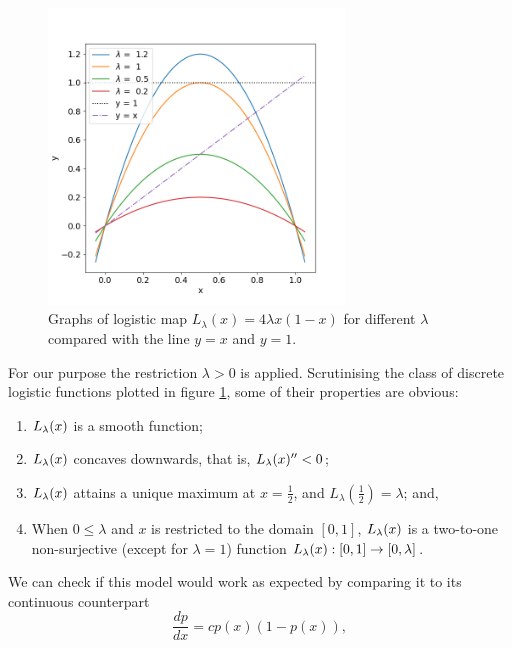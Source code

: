 \begin{figure}[t]
	\centering
	\includegraphics[width=0.7\textwidth]{./figures/logistic_map_diff_lambda.png}
	\caption{Graphs of logistic map $L_{\lambda}(x) = 4 \lambda x(1-x)$ for different $\lambda$ compared with the line $y=x$ and $y = 1$.} 
	\label{fig:logistic_map_diff_lambda}
\end{figure}

For our purpose the restriction $\lambda >0$ is applied.
Scrutinising the class of discrete logistic functions plotted in figure \ref{fig:logistic_map_diff_lambda}, some of their properties are obvious:

\begin{enumerate}
	\item $L_{\lambda}(x)$ is a smooth function;
	\item $L_{\lambda}(x)$ concaves downwards, that is, $L_{\lambda}(x)'' < 0$;
	\item $L_{\lambda}(x)$ attains a unique maximum at $x = \frac{1}{2}$, and $L_{\lambda}(\frac{1}{2}) = \lambda$; and,
	\item When $0 \leq \lambda$ and $x$ is restricted to the domain $[0, 1]$, $L_{\lambda}(x)$ is a two-to-one non-surjective (except for $\lambda = 1$) function $L_{\lambda}(x): [0,1] \rightarrow [0,\lambda]$. 
\end{enumerate}


We can check if this model would work as expected by comparing it to its continuous counterpart 
\begin{equation}\label{eq_logistic_continuous}
	\frac{dp}{dx} = c p(x) (1-p(x)),
\end{equation}

